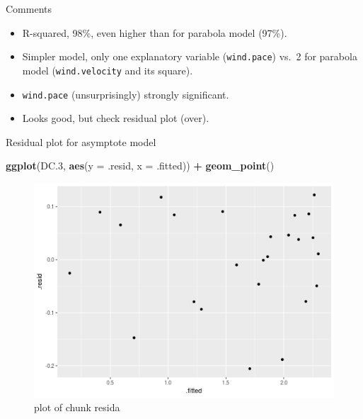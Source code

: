 \documentclass[ignorenonframetext,]{beamer}
\newenvironment{Shaded}{\begin{snugshade}}{\end{snugshade}}
\newcommand{\DataTypeTok}[1]{\textcolor[rgb]{0.13,0.29,0.53}{#1}}
\newcommand{\FloatTok}[1]{\textcolor[rgb]{0.00,0.00,0.81}{#1}}
\newcommand{\KeywordTok}[1]{\textcolor[rgb]{0.13,0.29,0.53}{\textbf{#1}}}
\newcommand{\NormalTok}[1]{#1}
\newcommand{\OperatorTok}[1]{\textcolor[rgb]{0.81,0.36,0.00}{\textbf{#1}}}
\newcommand{\StringTok}[1]{\textcolor[rgb]{0.31,0.60,0.02}{#1}}
\providecommand{\tightlist}{%
  \setlength{\itemsep}{0pt}\setlength{\parskip}{0pt}}
\begin{document}
\begin{frame}[fragile]{Comments}
\protect\hypertarget{comments-12}{}

\begin{itemize}
\tightlist
\item
  R-squared, 98\%, even higher than for parabola model (97\%).
\item
  Simpler model, only one explanatory variable (\texttt{wind.pace})
  vs.~2 for parabola model (\texttt{wind.velocity} and its square).
\item
  \texttt{wind.pace} (unsurprisingly) strongly significant.
\item
  Looks good, but check residual plot (over).
\end{itemize}

\end{frame}

\begin{frame}[fragile]{Residual plot for asymptote model}
\protect\hypertarget{residual-plot-for-asymptote-model}{}

\begin{Shaded}
\begin{Highlighting}[]
\KeywordTok{ggplot}\NormalTok{(DC}\FloatTok{.3}\NormalTok{, }\KeywordTok{aes}\NormalTok{(}\DataTypeTok{y =}\NormalTok{ .resid, }\DataTypeTok{x =}\NormalTok{ .fitted)) }\OperatorTok{+}\StringTok{ }\KeywordTok{geom_point}\NormalTok{()}
\end{Highlighting}
\end{Shaded}

\begin{figure}
\centering
\includegraphics{figure/resida-1.png}
\caption{plot of chunk resida}
\end{figure}

\end{frame}
\end{document}
